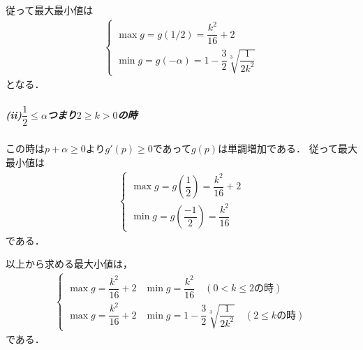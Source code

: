 \documentclass[../../main.tex]{subfiles}
\begin{document}
従って最大最小値は
\begin{align}
  \begin{cases}
    \max g= g(1/2)     = \dfrac{k^2}{16}+2  \\
    \min g= g(-\alpha) = 1-\dfrac{3}{2}\sqrt[3]{\dfrac{1}{2k^2}}
  \end{cases}
\end{align}
となる．

\subparagraph{(ii)$\dfrac{1}{2}\le \alpha$つまり$2\ge k>0$の時}

この時は$p+\alpha \ge 0$より$g'(p)\ge0$であって$g(p)$は単調増加である．
従って最大最小値は
\begin{align}
  \begin{cases}
    \max g=g\left(\dfrac{1}{2}\right) = \dfrac{k^2}{16}+2 \\
    \min g=g\left(\dfrac{-1}{2}\right) = \dfrac{k^2}{16}
  \end{cases}
\end{align}
である．
\casesend

以上から求める最大小値は，
\begin{align}
  \begin{cases}
    \max g=\dfrac{k^2}{16}+2 &  \min g=\dfrac{k^2}{16} \quad (0<k\le 2\text{の時}) \\
    \max g=\dfrac{k^2}{16}+2 & \min g=1-\dfrac{3}{2}\sqrt[3]{\dfrac{1}{2k^2}} \quad (2\le k\text{の時})
  \end{cases}
\end{align}
である．
\newpage
\end{document}
